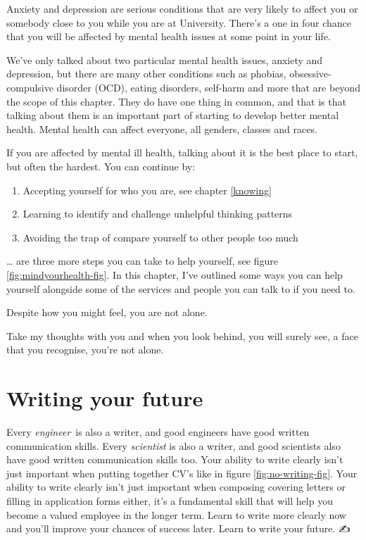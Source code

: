 \documentclass[
]{book}
\providecommand{\tightlist}{%
  \setlength{\itemsep}{0pt}\setlength{\parskip}{0pt}}
\begin{document}
Anxiety and depression are serious conditions that are very likely to affect you or somebody close to you while you are at University. There's a one in four chance that you will be affected by mental health issues at some point in your life.

We've only talked about two particular mental health issues, anxiety and depression, but there are many other conditions such as phobias, obsessive-compulsive disorder (OCD), eating disorders, self-harm and more that are beyond the scope of this chapter. They do have one thing in common, and that is that talking about them is an important part of starting to develop better mental health. Mental health can affect everyone, all genders, classes and races.

If you are affected by mental ill health, talking about it is the best place to start, but often the hardest. You can continue by:

\begin{enumerate}
\def\labelenumi{\arabic{enumi}.}
\tightlist
\item
  Accepting yourself for who you are, see chapter \ref{knowing}
\item
  Learning to identify and challenge unhelpful thinking patterns
\item
  Avoiding the trap of compare yourself to other people too much
\end{enumerate}

\ldots{} are three more steps you can take to help yourself, see figure \ref{fig:mindyourhealth-fig}. In this chapter, I've outlined some ways you can help yourself alongside some of the services and people you can talk to if you need to.

Despite how you might feel, you are not alone.

Take my thoughts with you and when you look behind, you will surely see, a face that you recognise, you're not alone. \citep{yourenotalone}

\hypertarget{writing}{%
\chapter{Writing your future}\label{writing}}

Every \emph{engineer}~is also a writer, and good engineers have good written communication skills. Every \emph{scientist} is also a writer, and good scientists also have good written communication skills too. Your ability to write clearly isn't just important when putting together CV's like in figure \ref{fig:no-writing-fig}. Your ability to write clearly isn't just important when composing covering letters or filling in application forms either, it's a fundamental skill that will help you become a valued employee in the longer term. Learn to write more clearly now and you'll improve your chances of success later. Learn to write your future. ✍️
\end{document}
